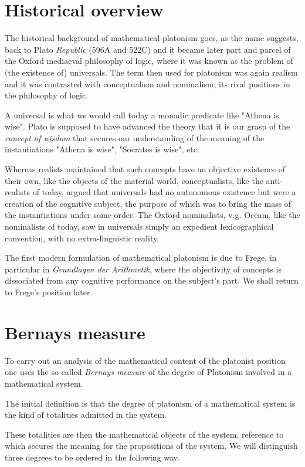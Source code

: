 \documentclass[12pt]{article}
\begin{document}
\section{Historical overview}\normalsize

The historical background of mathematical platonism goes, as the name suggests, back to Plato \emph{Republic} (596A and 522C) and it became later part and parcel of the Oxford mediaeval philosophy of logic, where it was known as the problem of (the existence of) universals. The term then used for platonism was again realism and it was contrasted with conceptualism and nominalism, its rival positions in the philosophy of logic.

A universal is what we would call today a monadic predicate like "Athena is wise". Plato is supposed to have advanced the theory that it is our grasp of the \emph{concept of wisdom} that secures our understanding of the meaning of the instantiations "Athena is wise", "Socrates is wise", etc.
 
Whereas realists maintained that such concepts have an objective existence of their own, like the objects of the material world, conceptualists, like the anti-realists of today, argued that universals had no autonomous existence but were a creation of the cognitive subject, the purpose of which was to bring the mass of the instantiations under some order. The Oxford nominalists, v.g. Occam, like the nominalists of today, saw in universals simply an expedient lexicographical convention, with no extra-linguistic reality.

The first modern formulation of mathematical platonism is due to Frege, in particular in \emph{Grundlagen der Arithmetik}, where the objectivity of concepts is dissociated from any cognitive performance on the subject's part. We shall return to Frege's position later.

\section{Bernays measure}\normalsize

To carry out an analysis of the mathematical content of the platonist position one uses the so-called \emph{Bernays measure} of the degree of Platonism involved in a mathematical system.

The initial definition is that the degree of platonism of a mathematical system is the kind of totalities admitted in the system.

These totalities are then the mathematical objects of the system, reference to which secures the meaning for the propositions of the system. We will distinguish three degrees to be ordered in the following way.
\end{document}
